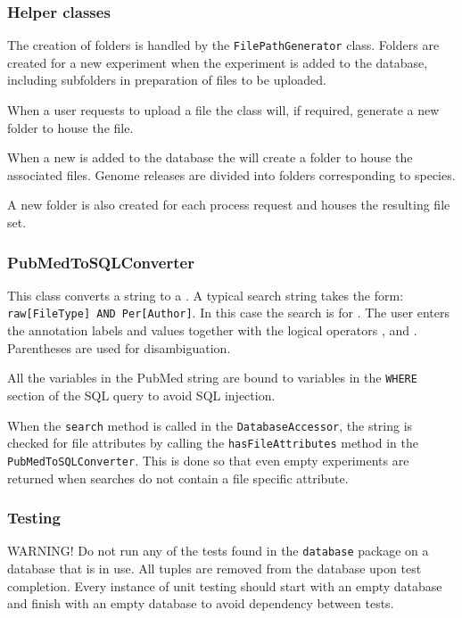 \subsubsection{Helper classes}
The creation of folders is handled by the \texttt{FilePathGenerator} class. Folders are created for a new experiment when the experiment is added to the database, including subfolders in preparation of files to be uploaded.

When a user requests to upload a file the  class will, if required, generate a new folder to house the file.

When a new  is added to the database the  will create a folder to house the associated files. Genome releases are divided into folders corresponding to species.

A new folder is also created for each process request and houses the resulting file set.

\subsubsection{PubMedToSQLConverter}
This class converts a  string to a . A typical  search string takes the form: \texttt{raw[FileType] AND Per[Author]}. In this case the search is for . The user enters the annotation labels and values together with the logical operators ,  and . Parentheses are used for disambiguation. 

All the variables in the PubMed string are bound to variables in the \texttt{WHERE} section of the SQL query to avoid SQL injection. 

When the \texttt{search} method is called in the \texttt{DatabaseAccessor}, the  string is checked for file attributes by calling the \texttt{hasFileAttributes} method in the \texttt{PubMedToSQLConverter}. This is done so that even empty experiments are returned when searches do not contain a file specific attribute.



\subsubsection{Testing}
WARNING! Do not run any of the tests found in the \texttt{database} package on a database that is in use. All tuples are removed from the database upon test completion. Every instance of unit testing should start with an empty database and finish with an empty database to avoid dependency between tests.

